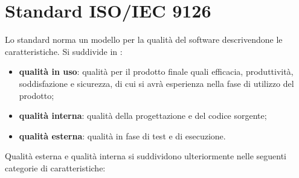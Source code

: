 \section{Standard ISO/IEC 9126}\label{app:iso9126}
Lo standard norma un modello per la qualità del software descrivendone le caratteristiche. Si suddivide in :
\begin{itemize}
	\item \textbf{qualità in uso}: qualità per il prodotto finale quali efficacia, produttività, soddisfazione e sicurezza, di cui si avrà esperienza nella fase di utilizzo del prodotto;
	\item \textbf{qualità interna}: qualità della progettazione e del codice sorgente;
	\item \textbf{qualità esterna}: qualità in fase di test e di esecuzione.
\end{itemize}
Qualità esterna e qualità interna si suddividono ulteriormente nelle seguenti categorie di caratteristiche:
